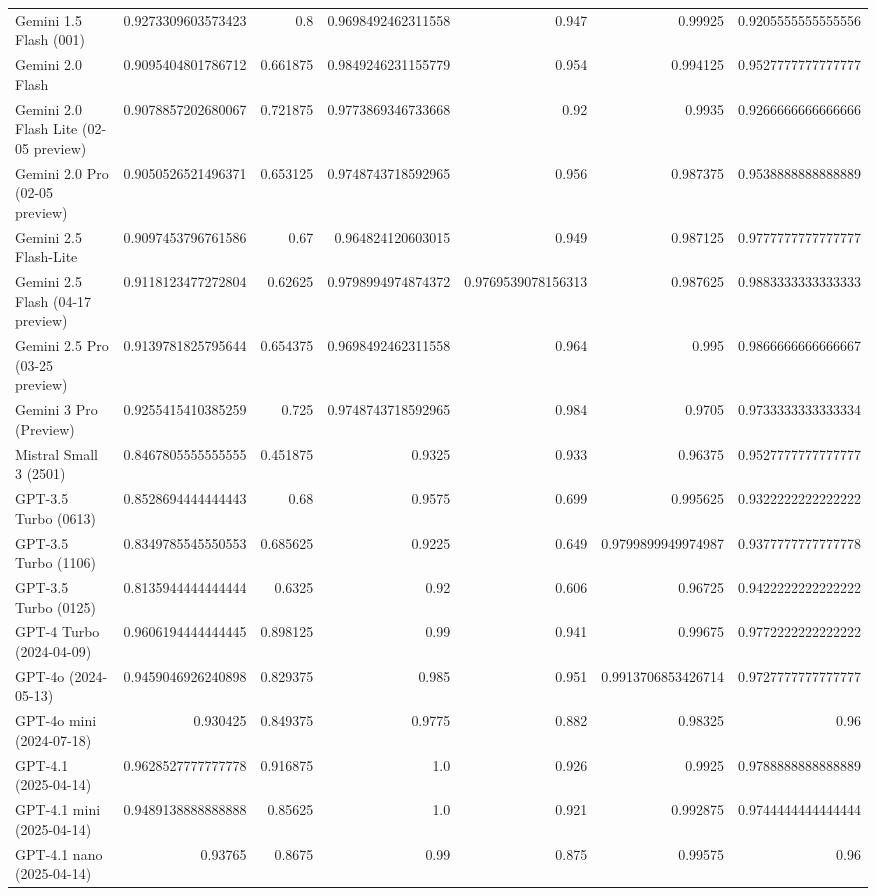 \begin{table}[htp]
{\begin{tabular}{lrrrrrr}
Gemini 1.5 Flash (001) & 0.9273309603573423 & 0.8 & 0.9698492462311558 & 0.947 & 0.99925 & 0.9205555555555556 \\
Gemini 2.0 Flash & 0.9095404801786712 & 0.661875 & 0.9849246231155779 & 0.954 & 0.994125 & 0.9527777777777777 \\
Gemini 2.0 Flash Lite (02-05 preview) & 0.9078857202680067 & 0.721875 & 0.9773869346733668 & 0.92 & 0.9935 & 0.9266666666666666 \\
Gemini 2.0 Pro (02-05 preview) & 0.9050526521496371 & 0.653125 & 0.9748743718592965 & 0.956 & 0.987375 & 0.9538888888888889 \\
Gemini 2.5 Flash-Lite & 0.9097453796761586 & 0.67 & 0.964824120603015 & 0.949 & 0.987125 & 0.9777777777777777 \\
Gemini 2.5 Flash (04-17 preview) & 0.9118123477272804 & 0.62625 & 0.9798994974874372 & 0.9769539078156313 & 0.987625 & 0.9883333333333333 \\
Gemini 2.5 Pro (03-25 preview) & 0.9139781825795644 & 0.654375 & 0.9698492462311558 & 0.964 & 0.995 & 0.9866666666666667 \\
Gemini 3 Pro (Preview) & 0.9255415410385259 & 0.725 & 0.9748743718592965 & 0.984 & 0.9705 & 0.9733333333333334 \\
Mistral Small 3 (2501) & 0.8467805555555555 & 0.451875 & 0.9325 & 0.933 & 0.96375 & 0.9527777777777777 \\
GPT-3.5 Turbo (0613) & 0.8528694444444443 & 0.68 & 0.9575 & 0.699 & 0.995625 & 0.9322222222222222 \\
GPT-3.5 Turbo (1106) & 0.8349785545550553 & 0.685625 & 0.9225 & 0.649 & 0.9799899949974987 & 0.9377777777777778 \\
GPT-3.5 Turbo (0125) & 0.8135944444444444 & 0.6325 & 0.92 & 0.606 & 0.96725 & 0.9422222222222222 \\
GPT-4 Turbo (2024-04-09) & 0.9606194444444445 & 0.898125 & 0.99 & 0.941 & 0.99675 & 0.9772222222222222 \\
GPT-4o (2024-05-13) & 0.9459046926240898 & 0.829375 & 0.985 & 0.951 & 0.9913706853426714 & 0.9727777777777777 \\
GPT-4o mini (2024-07-18) & 0.930425 & 0.849375 & 0.9775 & 0.882 & 0.98325 & 0.96 \\
GPT-4.1 (2025-04-14) & 0.9628527777777778 & 0.916875 & 1.0 & 0.926 & 0.9925 & 0.9788888888888889 \\
GPT-4.1 mini (2025-04-14) & 0.9489138888888888 & 0.85625 & 1.0 & 0.921 & 0.992875 & 0.9744444444444444 \\
GPT-4.1 nano (2025-04-14) & 0.93765 & 0.8675 & 0.99 & 0.875 & 0.99575 & 0.96 \\

\end{tabular}}
\end{table}
